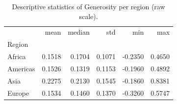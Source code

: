 \begin{table}
\caption{Descriptive statistics of Generosity per region (raw scale).}
\label{tab:generosity-region}
\begin{tabular}{lrrrrr}
\toprule
 & mean & median & std & min & max \\
Region &  &  &  &  &  \\
\midrule
Africa & 0.1518 & 0.1704 & 0.1071 & -0.2350 & 0.4650 \\
Americas & 0.1526 & 0.1319 & 0.1153 & -0.1960 & 0.4892 \\
Asia & 0.2275 & 0.2130 & 0.1545 & -0.1860 & 0.8381 \\
Europe & 0.1534 & 0.1460 & 0.1370 & -0.3260 & 0.5747 \\
\bottomrule
\end{tabular}
\end{table}
